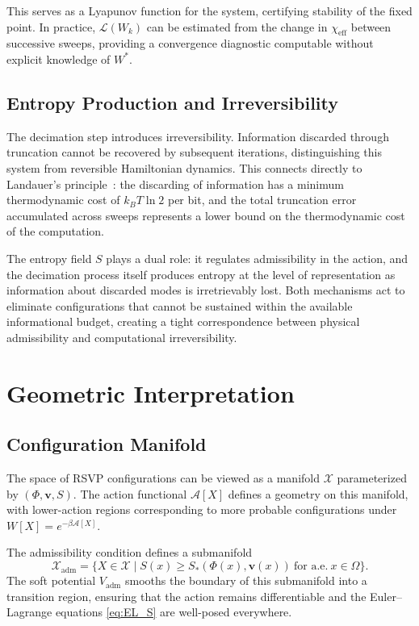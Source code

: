 \documentclass[11pt]{article}
\theoremstyle{definition}
\begin{document}
This serves as a Lyapunov function for the system, certifying stability of
the fixed point. In practice, $\mathcal{L}(W_k)$ can be estimated from the
change in $\chi_{\mathrm{eff}}$ between successive sweeps, providing a
convergence diagnostic computable without explicit knowledge of $W^*$.

\subsection{Entropy Production and Irreversibility}

The decimation step introduces irreversibility. Information discarded through
truncation cannot be recovered by subsequent iterations, distinguishing this
system from reversible Hamiltonian dynamics. This connects directly to
Landauer's principle~\cite{landauer1961}: the discarding of information has a
minimum thermodynamic cost of $k_B T \ln 2$ per bit, and the total truncation
error accumulated across sweeps represents a lower bound on the thermodynamic
cost of the computation.

The entropy field $S$ plays a dual role: it regulates admissibility in the
action, and the decimation process itself produces entropy at the level of
representation as information about discarded modes is irretrievably lost.
Both mechanisms act to eliminate configurations that cannot be sustained within
the available informational budget, creating a tight correspondence between
physical admissibility and computational irreversibility.

\section{Geometric Interpretation}

\subsection{Configuration Manifold}

The space of RSVP configurations can be viewed as a manifold $\mathcal{X}$
parameterized by $(\Phi,\mathbf{v},S)$. The action functional $\mathcal{A}[X]$
defines a geometry on this manifold, with lower-action regions corresponding to
more probable configurations under $W[X] = e^{-\beta\mathcal{A}[X]}$.

The admissibility condition defines a submanifold
\begin{equation}
  \mathcal{X}_{\mathrm{adm}}
  = \bigl\{ X \in \mathcal{X} \mid S(x) \ge S_*(\Phi(x),\mathbf{v}(x))
    \ \text{for a.e.}\ x \in \Omega \bigr\}.
\end{equation}
The soft potential $V_{\mathrm{adm}}$ smooths the boundary of this submanifold
into a transition region, ensuring that the action remains differentiable and
the Euler--Lagrange equations \eqref{eq:EL_S} are well-posed everywhere.
\end{document}
